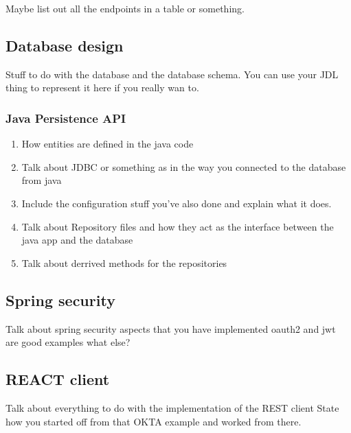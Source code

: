 Maybe list out all the endpoints in a table or something.

\subsection{Database design}

Stuff to do with the database and the database schema.
You can use your JDL thing to represent it here if you really wan to.

\subsubsection{Java Persistence API}
\begin{enumerate}
    \item How entities are defined in the java code 
    \item Talk about JDBC or something as in the way you connected to the database from java
    \item Include the configuration stuff you've also done and explain what it does.
    \item Talk about Repository files and how they act as the interface between the java app and the database
    \item Talk about derrived methods for the repositories
\end{enumerate}


\subsection{Spring security}

Talk about spring security aspects that you have implemented
oauth2 and jwt are good examples
what else?



\subsection{REACT client}
Talk about everything to do with the implementation of the REST client
State how you started off from that OKTA example and worked from there. 
